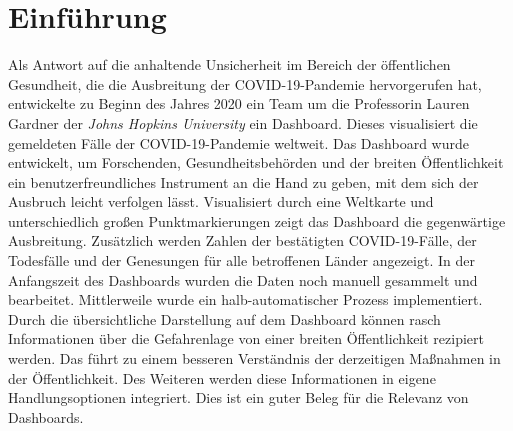 \chapter{Einführung}
Als Antwort auf die anhaltende Unsicherheit im Bereich der öffentlichen Gesundheit, die die Ausbreitung der COVID-19-Pandemie hervorgerufen hat, 
entwickelte zu Beginn des Jahres 2020 ein Team um die Professorin Lauren Gardner der \textit{Johns Hopkins University} ein Dashboard. 
Dieses visualisiert die gemeldeten Fälle der COVID-19-Pandemie weltweit. Das Dashboard wurde entwickelt, um Forschenden, Gesundheitsbehörden und der breiten Öffentlichkeit 
ein benutzerfreundliches Instrument an die Hand zu geben, mit dem sich der Ausbruch leicht verfolgen lässt.
Visualisiert durch eine Weltkarte und unterschiedlich großen Punktmarkierungen zeigt das Dashboard die gegenwärtige Ausbreitung.
Zusätzlich werden Zahlen der bestätigten COVID-19-Fälle, der Todesfälle und der Genesungen für alle betroffenen Länder angezeigt\cite[Vgl.][533]{dong_interactive_2020}.
In der Anfangszeit des Dashboards wurden die Daten noch manuell gesammelt und bearbeitet. Mittlerweile wurde ein halb-automatischer Prozess implementiert.
Durch die übersichtliche Darstellung auf dem Dashboard können rasch Informationen über die Gefahrenlage von einer breiten Öffentlichkeit
rezipiert werden. Das führt zu einem besseren Verständnis der derzeitigen Maßnahmen in der Öffentlichkeit. Des Weiteren werden diese Informationen
in eigene Handlungsoptionen integriert. Dies ist ein guter Beleg für die Relevanz von Dashboards.



